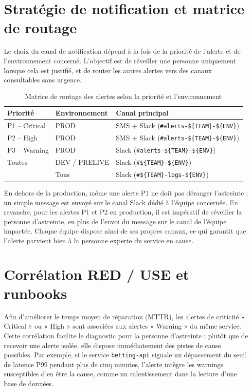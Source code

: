 \section{Stratégie de notification et matrice de routage}

Le choix du canal de notification dépend à la fois de la priorité de l'alerte et de l'environnement
concerné. L'objectif est de réveiller une personne uniquement lorsque cela est justifié, et de router
les autres alertes vers des canaux consultables sans urgence.

\begin{table}[h]
	\centering
	\caption{Matrice de routage des alertes selon la priorité et l'environnement}
	\label{tab:matrice-routage}
	\begin{tabular}{|p{}|p{}|p{}|}
		\hline
		\textbf{Priorité} & \textbf{Environnement} & \textbf{Canal principal} \\
		\hline
		P1 -- Critical & PROD & SMS + Slack (\texttt{\#alerts-\$\{TEAM\}-\$\{ENV\}}) \\
		\hline
		P2 -- High & PROD & SMS + Slack (\texttt{\#alerts-\$\{TEAM\}-\$\{ENV\}}) \\
		\hline
		P3 -- Warning & PROD & Slack (\texttt{\#alerts-\$\{TEAM\}-\$\{ENV\}}) \\
		\hline
		Toutes & DEV / PRELIVE & Slack (\texttt{\#\$\{TEAM\}-\$\{ENV\}}) \\
		\hline
		\lexique{Logs} & Tous & Slack (\texttt{\#\$\{TEAM\}-logs-\$\{ENV\}}) \\
		\hline
	\end{tabular}
\end{table}

En dehors de la production, même une alerte P1 ne doit pas déranger l'astreinte : un simple message est envoyé sur le canal Slack dédié à l'équipe
concernée. En revanche, pour les alertes P1 et P2 en production, il est impératif de réveiller la personne
d'astreinte, en plus de l'envoi du message sur le canal de l'équipe impactée. Chaque équipe dispose ainsi de ses propres canaux, ce qui garantit
que l'alerte parvient bien à la personne experte du service en cause.

\section{Corrélation RED / USE et runbooks}

Afin d'améliorer le temps moyen de réparation (MTTR), les alertes  de criticité « Critical » ou
« High » sont associées aux alertes  « Warning » du même service. Cette corrélation facilite le diagnostic pour la personne d'astreinte : plutôt que de recevoir
une alerte isolée, elle dispose immédiatement des pistes de cause possibles. Par exemple, si le service
\texttt{betting-api} signale un dépassement du seuil de latence P99 pendant plus de cinq minutes,
l'alerte intègre les warnings susceptibles d'en être la cause, comme un ralentissement dans la lecture
d'une base de données.

